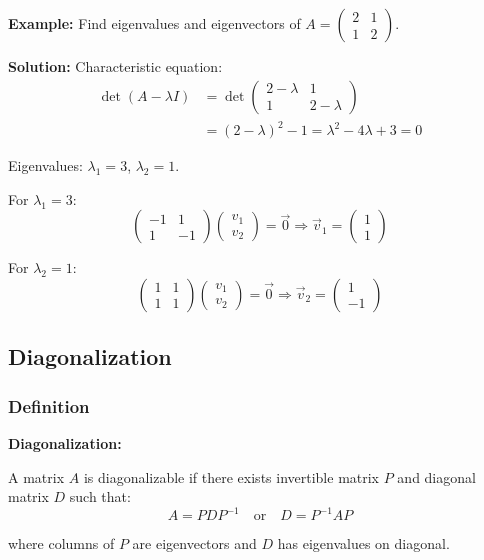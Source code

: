 \documentclass[12pt,a4paper]{article}
\begin{document}
\begin{examplebox}
\textbf{Example:} Find eigenvalues and eigenvectors of $A = \begin{pmatrix} 2 & 1 \\ 1 & 2 \end{pmatrix}$.

\textbf{Solution:} Characteristic equation:
\begin{align}
\det(A - \lambda I) &= \det\begin{pmatrix} 2-\lambda & 1 \\ 1 & 2-\lambda \end{pmatrix} \\
&= (2-\lambda)^2 - 1 = \lambda^2 - 4\lambda + 3 = 0
\end{align}

Eigenvalues: $\lambda_1 = 3$, $\lambda_2 = 1$.

For $\lambda_1 = 3$:
\begin{equation}
\begin{pmatrix} -1 & 1 \\ 1 & -1 \end{pmatrix}\begin{pmatrix} v_1 \\ v_2 \end{pmatrix} = \vec{0} \Rightarrow \vec{v}_1 = \begin{pmatrix} 1 \\ 1 \end{pmatrix}
\end{equation}

For $\lambda_2 = 1$:
\begin{equation}
\begin{pmatrix} 1 & 1 \\ 1 & 1 \end{pmatrix}\begin{pmatrix} v_1 \\ v_2 \end{pmatrix} = \vec{0} \Rightarrow \vec{v}_2 = \begin{pmatrix} 1 \\ -1 \end{pmatrix}
\end{equation}
\end{examplebox}

\subsection{Diagonalization}
\subsubsection{Definition}
\begin{formulabox}
\textbf{Diagonalization:}

A matrix $A$ is diagonalizable if there exists invertible matrix $P$ and diagonal matrix $D$ such that:
\begin{equation}
A = PDP^{-1} \quad \text{or} \quad D = P^{-1}AP
\end{equation}

where columns of $P$ are eigenvectors and $D$ has eigenvalues on diagonal.
\end{formulabox}
\end{document}
